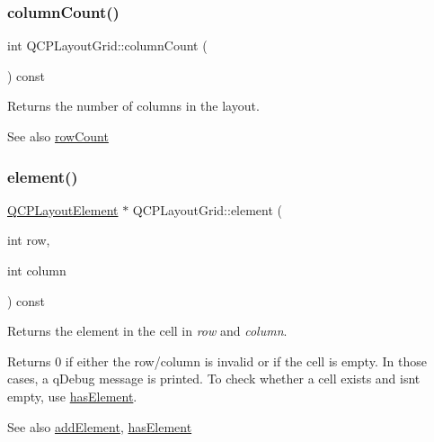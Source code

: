 \subsubsection{\texorpdfstring{column\+Count()}{columnCount()}}
{\footnotesize\ttfamily int Q\+C\+P\+Layout\+Grid\+::column\+Count (\begin{DoxyParamCaption}{ }\end{DoxyParamCaption}) const}

Returns the number of columns in the layout.

\begin{DoxySeeAlso}{See also}
\mbox{\hyperlink{class_q_c_p_layout_grid_a19c66fd76cbce58a8e94f33797e0c0aa}{row\+Count}} 
\end{DoxySeeAlso}
\mbox{\label{class_q_c_p_layout_grid_a602b426609b4411cf6a93c3ddf3a381a}} 
\subsubsection{\texorpdfstring{element()}{element()}}
{\footnotesize\ttfamily \mbox{\hyperlink{class_q_c_p_layout_element}{Q\+C\+P\+Layout\+Element}} $\ast$ Q\+C\+P\+Layout\+Grid\+::element (\begin{DoxyParamCaption}\item[{int}]{row,  }\item[{int}]{column }\end{DoxyParamCaption}) const}

Returns the element in the cell in {\itshape row} and {\itshape column}.

Returns 0 if either the row/column is invalid or if the cell is empty. In those cases, a q\+Debug message is printed. To check whether a cell exists and isn\textquotesingle{}t empty, use \mbox{\hyperlink{class_q_c_p_layout_grid_ab0cf4f7edc9414a3bfaddac0f46dc0a0}{has\+Element}}.

\begin{DoxySeeAlso}{See also}
\mbox{\hyperlink{class_q_c_p_layout_grid_adff1a2ca691ed83d2d24a4cd1fe17012}{add\+Element}}, \mbox{\hyperlink{class_q_c_p_layout_grid_ab0cf4f7edc9414a3bfaddac0f46dc0a0}{has\+Element}} 
\end{DoxySeeAlso}
\mbox{\label{class_q_c_p_layout_grid_a97672ecc379cb3a09639926ba9980297}} 
